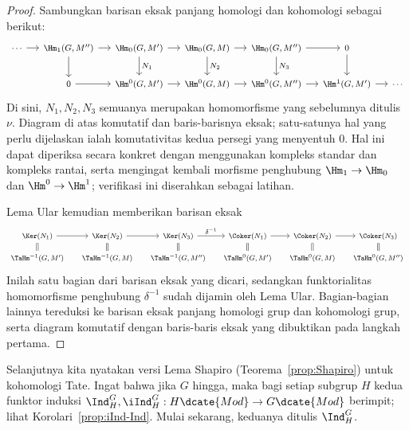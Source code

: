 \begin{proof}
	Sambungkan barisan eksak panjang homologi dan kohomologi sebagai berikut:
	\[\begin{tikzcd}[column sep=small, every cell/.append style={font = \footnotesize}]
		\cdots \arrow[r] & \Hm_1(G, M'') \arrow[r] \arrow[d] & \Hm_0(G, M') \arrow[r] \arrow[d, "{N_1}"] & \Hm_0(G, M) \arrow[r] \arrow[d, "N_2"] & \Hm_0(G, M'') \arrow[r] \arrow[d, "N_3"] & 0 \arrow[d] & \\
		& 0 \arrow[r] & \Hm^0(G, M') \arrow[r] & \Hm^0(G, M) \arrow[r] & \Hm^0(G, M'') \arrow[r] & \Hm^1(G, M') \arrow[r] & \cdots
	\end{tikzcd}\]
	Di sini, $N_1,N_2,N_3$ semuanya merupakan homomorfisme yang sebelumnya
	ditulis $\nu$. Diagram di atas komutatif dan baris-barisnya eksak; satu-satunya
	hal yang perlu dijelaskan ialah komutativitas kedua persegi yang menyentuh
	$0$. Hal ini dapat diperiksa secara konkret dengan menggunakan kompleks
	standar dan kompleks rantai, serta mengingat kembali morfisme penghubung
	$\Hm_1 \to \Hm_0$ dan $\Hm^0 \to \Hm^1$; verifikasi ini diserahkan sebagai
	latihan.

	Lema Ular kemudian memberikan barisan eksak
	\[\begin{tikzcd}[row sep=small, column sep=small, every cell/.append style={font = \footnotesize}]
		\Ker(N_1) \arrow[r] & \Ker(N_2) \arrow[r] & \Ker(N_3) \arrow[r, "{\delta^{-1}}"] & \Coker(N_1) \arrow[r] & \Coker(N_2) \arrow[r] & \Coker(N_3) \\
		\TaHm^{-1}(G, M') \arrow[equal, u] & \TaHm^{-1}(G, M) \arrow[equal, u] & \TaHm^{-1}(G, M'') \arrow[equal, u] & \TaHm^0(G, M') \arrow[equal, u] & \TaHm^0(G, M) \arrow[equal, u] & \TaHm^0(G, M'') \arrow[equal, u]
	\end{tikzcd}\]
	Inilah satu bagian dari barisan eksak yang dicari, sedangkan funktorialitas
	homomorfisme penghubung $\delta^{-1}$ sudah dijamin oleh Lema Ular.
	Bagian-bagian lainnya tereduksi ke barisan eksak panjang homologi grup dan
	kohomologi grup, serta diagram komutatif dengan baris-baris eksak yang
	dibuktikan pada langkah pertama.
\end{proof}

Selanjutnya kita nyatakan versi Lema Shapiro (Teorema~\ref{prop:Shapiro}) untuk
kohomologi Tate. Ingat bahwa jika $G$ hingga, maka bagi setiap subgrup $H$ kedua
funktor induksi
$\Ind^G_H,\iInd^G_H:H\dcate{Mod}\to G\dcate{Mod}$ berimpit; lihat
Korolari~\ref{prop:iInd-Ind}. Mulai sekarang, keduanya ditulis $\Ind^G_H$.

